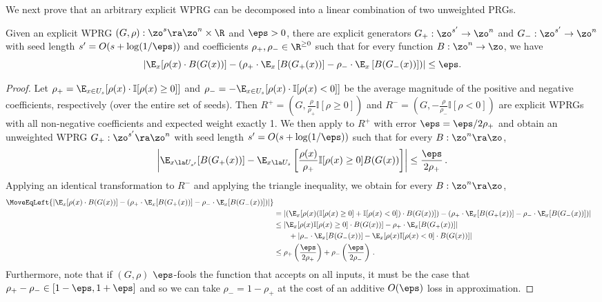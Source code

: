 We next prove that an arbitrary explicit WPRG can be decomposed into a linear combination of two unweighted PRGs. %
\begin{proposition}
Given an explicit WPRG $(G,\rho) : \zo^s \ra \zo^n\times \R$ and $\eps>0$, there are 
explicit generators $G_+ : \zo^{s'}\rightarrow \zo^n$ and $G_- : \zo^{s'}\rightarrow \zo^n$ with seed length
$s'=O(s+\log(1/\eps))$ and coefficients $\rho_+,\rho_-\in \R^{\geq 0}$ such that for every function $B : \zo^n\rightarrow \zo$, we have %
\[\left|\E_x[\rho(x)\cdot B(G(x))] - \left( 
\rho_+\cdot \E_x\left[B(G_+(x))\right] - \rho_-\cdot \E_x\left[B(G_-(x))\right]\right)\right|\leq \eps.\]
\end{proposition}
\begin{proof}
Let $\rho_+=\E_{x\in U_s}[\rho(x)\cdot \mathbb{I}[\rho(x)\geq 0]]$ and $\rho_-=-\E_{x\in U_s}[\rho(x)\cdot \mathbb{I}[\rho(x)< 0]]$ be the average magnitude of the positive and negative coefficients,
%
respectively (over the entire set of seeds). Then $R^+=(G,\frac{\rho}{\rho_+}\mathbb{I}[\rho \geq 0])$ and $R^-=(G,-\frac{\rho}{\rho_-}\mathbb{I}[\rho< 0])$ are explicit WPRGs with all non-negative coefficients and expected weight exactly 1. We then apply  to $R^+$ with error $\eps=\eps/2\rho_+$ and obtain an unweighted WPRG $G_+:\zo^{s'}\ra\zo^n$ with seed length $s'=O(s+\log(1/\eps))$ such that for every $B:\zo^n\ra\zo$,
\[\left|\E_{x\la U_{s'}}[B(G_+(x))] - \E_{x\la U_{s}}\left[\frac{\rho(x)}{\rho_+}\mathbb{I}[\rho(x)\geq 0]B(G(x))\right]
\right|\leq \frac{\eps}{2\rho_+}\,.\] %
Applying an identical transformation to $R^-$ and applying the triangle inequality, we obtain for every $B:\zo^n\ra\zo$,
\begin{align*}
%
    \MoveEqLeft{\left|\E_x[\rho(x)\cdot B(G(x))] - \left(\rho_+ \cdot \E_x[B(G_+(x))]-\rho_-\cdot \E_x[B(G_-(x))]\right)\right|}\\ 
    &= \left|\left(\E_x[\rho(x)(\mathbb{I}[\rho(x)\geq 0]+\mathbb{I}[\rho(x)< 0])\cdot B(G(x))] \right)-\left( \rho_+ \cdot \E_x[B(G_+(x))]-\rho_-\cdot \E_x[B(G_-(x))] \right)\right|\\
    &\leq \left|\E_x[\rho(x)\mathbb{I}[\rho(x)\geq 0]\cdot B(G(x))]- \rho_+ \cdot \E_x[B(G_+(x))]\right| \\
%
%
    &\qquad +\left|\rho_-\cdot \E_x[B(G_-(x))]-\E_x[\rho(x)\mathbb{I}[\rho(x)< 0]\cdot B(G(x))]\right|\\
    &\leq \rho_+\left(\frac{\eps}{2\rho_+}\right)+\rho_-\left(\frac{\eps}{2\rho_-}\right)\,.
\end{align*}
%
Furthermore, note that if $(G,\rho)$ $\eps$-fools the function that accepts on all inputs, it must be the case that $\rho_+-\rho_-\in [1- \eps,1+\eps]$ and so we can take $\rho_-=1-\rho_+$ at the cost of an additive $O(\eps)$ loss in approximation.
\end{proof}
